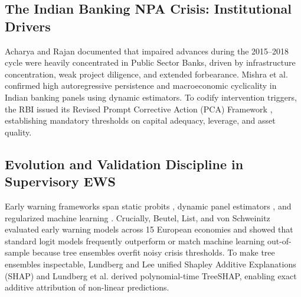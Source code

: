 \documentclass[conference]{IEEEtran}
\begin{document}
\subsection{The Indian Banking NPA Crisis: Institutional Drivers}
Acharya \cite{acharya2020} and Rajan \cite{rajan2018} documented that impaired advances during the 2015--2018 cycle were heavily concentrated in Public Sector Banks, driven by infrastructure concentration, weak project diligence, and extended forbearance. Mishra et al. \cite{mishra2021} confirmed high autoregressive persistence and macroeconomic cyclicality in Indian banking panels using dynamic estimators. To codify intervention triggers, the RBI issued its Revised Prompt Corrective Action (PCA) Framework \cite{rbi_pca2021}, establishing mandatory thresholds on capital adequacy, leverage, and asset quality.

\subsection{Evolution and Validation Discipline in Supervisory EWS}
Early warning frameworks span static probits \cite{berger1997, messai2013}, dynamic panel estimators \cite{arellano1991, blundell1998}, and regularized machine learning \cite{chen2016}. Crucially, Beutel, List, and von Schweinitz \cite{beutel2019} evaluated early warning models across 15 European economies and showed that standard logit models frequently outperform or match machine learning out-of-sample because tree ensembles overfit noisy crisis thresholds. To make tree ensembles inspectable, Lundberg and Lee \cite{lundberg2017} unified Shapley Additive Explanations (SHAP) and Lundberg et al. \cite{lundberg2020} derived polynomial-time TreeSHAP, enabling exact additive attribution of non-linear predictions.
\end{document}
